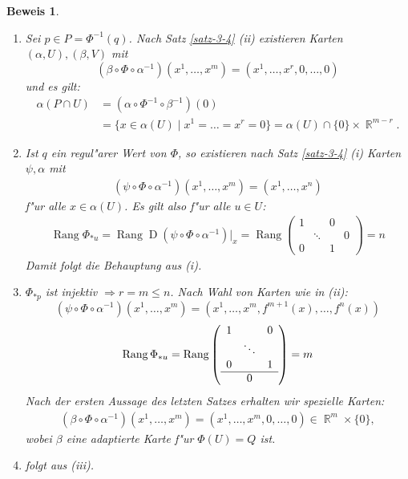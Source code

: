 \documentclass[paper=A4, twoside, chapterprefix=true, bibliography=totoc, headsepline]{scrbook}
\DeclareMathOperator{\R}{\mathbb{R}}
\DeclareMathOperator{\D}{D}         %
\DeclareMathOperator{\Rang}{Rang}   %
\theoremstyle{plain}
\theoremstyle{nonumberplain}
\newtheorem{bew}{Beweis}
\theoremstyle{empty}
\theoremstyle{break}
\begin{document}
\begin{bew}\begin{enumerate}[label=(\roman*),widest=iii,leftmargin=*]
\item
	Sei $p \in P = \Phi^{-1}(q)$. Nach Satz \ref{satz-3-4} (ii) existieren Karten $(\alpha,U), (\beta, V)$ mit 
		\[ (\beta \circ \Phi \circ \alpha^{-1})(x^1,\ldots,x^m) = (x^1, \ldots,x^r, 0, \ldots, 0) \]
	und es gilt:
	\begin{align*}
		\alpha(P \cap U) & = (\alpha \circ \Phi^{-1} \circ \beta^{-1})(0) \\
		& = \{x \in \alpha (U) \mid x^1 = \ldots = x^r = 0\} = \alpha(U) \cap \{0\} \times \R^{m-r}.
	\end{align*} 
\item
	Ist $q$ ein regul"arer Wert von $\Phi$, so existieren nach Satz \ref{satz-3-4} (i) Karten $\psi, \alpha$ mit 
	\begin{align*}
		(\psi \circ \Phi \circ \alpha^{-1})(x^1, \ldots, x^m) = (x^1, \ldots, x^n) \tag{$m  \geq n = r$}
	\end{align*}
	f"ur alle $x \in \alpha(U)$. Es gilt also f"ur alle $u \in U$:
	\begin{align*}
		\Rang \Phi_{*u} = \Rang \D(\psi \circ \Phi \circ \alpha^{-1})|_x = \Rang
		\left(\begin{array}{ccc|c}
			1 &  & 0 & \\
			& \ddots & & 0 \\
			0 & & 1 & 
		\end{array}\right)
		= n
	\end{align*}
	Damit folgt die Behauptung aus (i).
\item
	$\Phi_{*p}$ ist injektiv $\Rightarrow r = m \leq n$. Nach Wahl von Karten wie in (ii):
		\[ (\psi \circ \Phi \circ \alpha^{-1})(x^1, \ldots, x^m) = (x^1, \ldots, x^m,f^{m+1}(x), \ldots, f^n(x)) \]
		\[\Rang \Phi_{*u} = \Rang 
			\left( \begin{array}{ccc}
				1 & & 0 \\
				& \ddots &  \\
				0 & & 1 \\
				\hline
				& 0      & 
			\end{array} \right)
		= m \]
	Nach der ersten Aussage des letzten Satzes erhalten wir spezielle Karten:
	\begin{align*}
		(\beta \circ \Phi \circ \alpha^{-1})(x^1, \ldots, x^m) = (x^1, \ldots, x^m, 0, \ldots, 0) \in \R^{m} \times \{0\},
	\end{align*}
	wobei $\beta$ eine adaptierte Karte f"ur $\Phi(U) = Q$ ist.
\item
	folgt aus (iii).
\end{enumerate}\end{bew}
\end{document}
